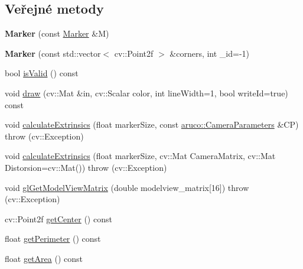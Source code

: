 \subsection*{Veřejné metody}
\begin{DoxyCompactItemize}
\item 
\hypertarget{class_ar_pipe_1_1_marker_a3d32fab3fb0d1e3f1624fa1fc39e99b2}{{\bfseries Marker} (const \hyperlink{class_ar_pipe_1_1_marker}{Marker} \&M)}\label{d4/dc2/class_ar_pipe_1_1_marker_a3d32fab3fb0d1e3f1624fa1fc39e99b2}

\item 
\hypertarget{class_ar_pipe_1_1_marker_adf46f98ed52fa2d62d82a5558b0df012}{{\bfseries Marker} (const std\-::vector$<$ cv\-::\-Point2f $>$ \&corners, int \-\_\-id=-\/1)}\label{d4/dc2/class_ar_pipe_1_1_marker_adf46f98ed52fa2d62d82a5558b0df012}

\item 
bool \hyperlink{class_ar_pipe_1_1_marker_a5b2c8cec27db5cf9b26bb356542e8030}{is\-Valid} () const 
\item 
void \hyperlink{class_ar_pipe_1_1_marker_a7f9ac55816ba4e1ae1a991124042b648}{draw} (cv\-::\-Mat \&in, cv\-::\-Scalar color, int line\-Width=1, bool write\-Id=true) const 
\item 
void \hyperlink{class_ar_pipe_1_1_marker_adcb88ee0c2c59ceeb5ec706c18bae2b3}{calculate\-Extrinsics} (float marker\-Size, const \hyperlink{classaruco_1_1_camera_parameters}{aruco\-::\-Camera\-Parameters} \&C\-P)  throw (cv\-::\-Exception)
\item 
void \hyperlink{class_ar_pipe_1_1_marker_a2e6a3942e1e41b99b9051e654889fb85}{calculate\-Extrinsics} (float marker\-Size, cv\-::\-Mat Camera\-Matrix, cv\-::\-Mat Distorsion=cv\-::\-Mat())  throw (cv\-::\-Exception)
\item 
void \hyperlink{class_ar_pipe_1_1_marker_a5850ed86671d366d640d1c98b5dc4176}{gl\-Get\-Model\-View\-Matrix} (double modelview\-\_\-matrix\mbox{[}16\mbox{]})  throw (cv\-::\-Exception)
\item 
cv\-::\-Point2f \hyperlink{class_ar_pipe_1_1_marker_ae3529020574d565123af96b299a2dabc}{get\-Center} () const 
\item 
float \hyperlink{class_ar_pipe_1_1_marker_a067e6e118c4c310c104a039ed977bab5}{get\-Perimeter} () const 
\item 
float \hyperlink{class_ar_pipe_1_1_marker_ad7fc8a998dd21668d1f0bacf18c320b6}{get\-Area} () const 
\end{DoxyCompactItemize}
